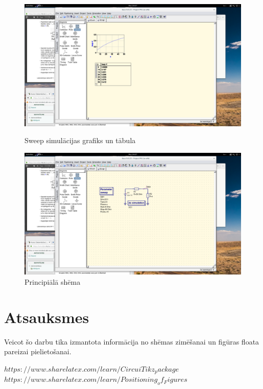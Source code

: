 \documentclass{report}
\begin{document}
\begin{figure}[!b]
\includegraphics[width=13cm]{bildes/qucs1.png}
\caption{Sweep simulācijas grafiks un tābula}
\label{4}
\includegraphics[width=13cm]{bildes/qucs2.png}
\caption{Principiālā shēma}
\label{5}
\end{figure}

\chapter{Atsauksmes}
Veicot šo darbu tika izmantota informācija no \cite{1} shēmas zimēšanai un \cite{2} figūras floata pareizai pielietošanai.

\begin{thebibliography}{2}
\texttt{$https://www.sharelatex.com/learn/CircuiTikz_package$}
\texttt{$https://www.sharelatex.com/learn/Positioning_of_Figures$}

\end{thebibliography}
\end{document}
